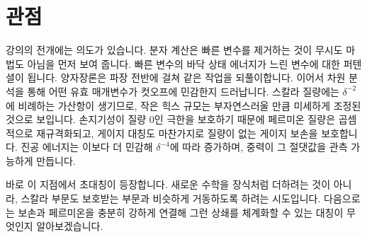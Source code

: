 \begin{classroomqa}
\end{classroomqa}

\begin{classroomqa}
\end{classroomqa}

\section{관점}

강의의 전개에는 의도가 있습니다. 분자 계산은 빠른 변수를 제거하는 것이 무시도 마법도 아님을 먼저 보여 줍니다. 빠른 변수의 바닥 상태 에너지가 느린 변수에 대한 퍼텐셜이 됩니다. 양자장론은 파장 전반에 걸쳐 같은 작업을 되풀이합니다. 이어서 차원 분석을 통해 어떤 유효 매개변수가 컷오프에 민감한지 드러납니다. 스칼라 질량에는 \(\delta^{-2}\)에 비례하는 가산항이 생기므로, 작은 힉스 규모는 부자연스러울 만큼 미세하게 조정된 것으로 보입니다. 손지기성이 질량 0인 극한을 보호하기 때문에 페르미온 질량은 곱셈적으로 재규격화되고, 게이지 대칭도 마찬가지로 질량이 없는 게이지 보손을 보호합니다. 진공 에너지는 이보다 더 민감해 \(\delta^{-4}\)에 따라 증가하며, 중력이 그 절댓값을 관측 가능하게 만듭니다.

바로 이 지점에서 초대칭이 등장합니다. 새로운 수학을 장식처럼 더하려는 것이 아니라, 스칼라 부문도 보호받는 부문과 비슷하게 거동하도록 하려는 시도입니다. 다음으로는 보손과 페르미온을 충분히 강하게 연결해 그런 상쇄를 체계화할 수 있는 대칭이 무엇인지 알아보겠습니다.